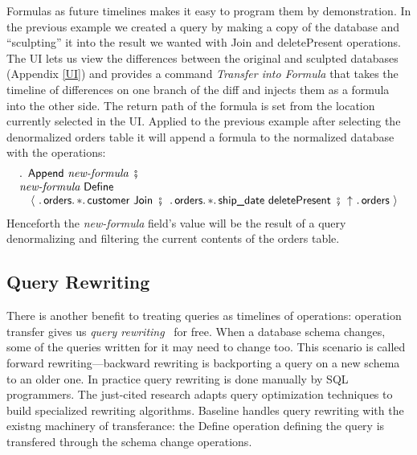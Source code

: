 \documentclass[english,submission]{programming}
\theoremstyle{definition}
\DeclareMathOperator{\exec}{\ \fatsemi\ \ }
\begin{document}
Formulas as future timelines makes it easy to program them by demonstration. In the previous example we created a query by making a copy of the database and ``sculpting'' it into the result we wanted with \textsf{Join} and \textsf{deletePresent} operations. The UI lets us view the differences between the original and sculpted databases (Appendix \ref{UI}) and provides a command \textit{Transfer into Formula} that takes the timeline of differences on one branch of the diff and injects them as a formula into the other side. The return path of the formula is set from the location currently selected in the UI. Applied to the previous example after selecting the denormalized \textsf{orders} table it will append a formula to the normalized database with the operations:
\[
\begin{array}{l}
  \ldotp \textsf{ Append } \textit{new-formula} \exec\\
  \textit{new-formula} \textsf{ Define } \\
  \quad \langle
\ \ldotp \textsf{orders}\ldotp * \ldotp \textsf{customer Join} \exec
\ldotp \textsf{orders}\ldotp * \ldotp \textsf{ship\_date deletePresent} \exec
\!\!\uparrow \ \ldotp \textsf{orders}\
  \rangle\\
\end{array}
\]
Henceforth the \textit{new-formula} field's value will be the result of a query  denormalizing and filtering the current contents of the orders table.






\subsection{Query Rewriting}\label{query-rewriting}

There is another benefit to treating queries as timelines of operations: operation transfer gives us \textit{query rewriting}~\cite{curino08, herrmann17} for free. When a database schema changes, some of the queries written for it may need to change too. This scenario is called forward rewriting---backward rewriting is backporting a query on a new schema to an older one.
In practice query rewriting is done manually by SQL programmers. The just-cited research adapts query optimization techniques to build specialized rewriting algorithms.
Baseline handles query rewriting with the existng machinery of transferance: the \textsf{Define} operation defining the query is transfered through the schema change operations.
\end{document}
